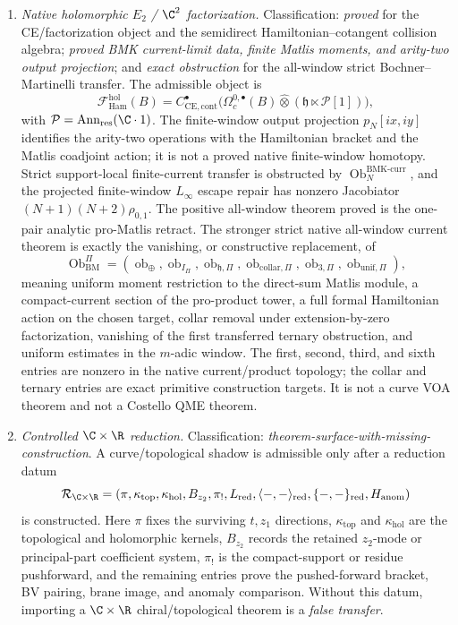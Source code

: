 \begin{enumerate}
  \item \emph{Native holomorphic \(E_2\) / \(\C^2\) factorization.}
  Classification: \emph{proved} for the CE/factorization object and the
  semidirect Hamiltonian--cotangent collision algebra;
  \emph{proved BMK current-limit data, finite Matlis moments, and
  arity-two output projection}; and
  \emph{exact obstruction} for the all-window strict
  Bochner--Martinelli transfer.  The admissible object is
  \[
    \mathcal F_{\mathrm{Ham}}^{\mathrm{hol}}(B)
    =
    C^\bullet_{\mathrm{CE},\mathrm{cont}}
    \bigl(\Omega_c^{0,\bullet}(B)\widehat\otimes
    (\mathfrak h\ltimes\mathcal P[1])\bigr),
  \]
  with \(\mathcal P=\operatorname{Ann}_{\mathrm{res}}(\C\cdot1)\).
  The finite-window output projection \(p_N[ix,iy]\) identifies the
  arity-two operations with the Hamiltonian bracket and the Matlis
  coadjoint action; it is not a proved native finite-window homotopy.
  Strict support-local finite-current transfer is obstructed by
  \(\operatorname{Ob}^{\mathrm{BMK\mbox{-}curr}}_N\), and the projected
  finite-window \(L_\infty\) escape repair has nonzero Jacobiator
  \((N+1)(N+2)\rho_{0,1}\).  The positive all-window theorem proved
  is the one-pair analytic pro-Matlis retract.  The stronger
  strict native all-window current theorem is exactly the vanishing, or
  constructive replacement, of
  \[
    \operatorname{Ob}^{\Pi}_{\mathrm{BM}}
    =
    (\operatorname{ob}_{\oplus},
     \operatorname{ob}_{I_\Pi},
     \operatorname{ob}_{\mathfrak h,\Pi},
     \operatorname{ob}_{\mathrm{collar},\Pi},
     \operatorname{ob}_{3,\Pi},
     \operatorname{ob}_{\mathrm{unif},\Pi}),
  \]
  meaning uniform moment restriction to the direct-sum Matlis module,
  a compact-current section of the pro-product tower, a full formal
  Hamiltonian action on the chosen target, collar removal under
  extension-by-zero factorization, vanishing of the first transferred
  ternary obstruction, and uniform estimates in the \(m\)-adic window.
  The first, second, third, and sixth entries are nonzero in the native
  current/product topology; the collar and ternary entries are exact
  primitive construction targets.
  It is not a curve VOA theorem and not a Costello QME theorem.

  \item \emph{Controlled \(\C\times\R\) reduction.}
  Classification: \emph{theorem-surface-with-missing-construction}.
  A curve/topological shadow is admissible only after a reduction datum
  \[
    \mathcal R_{\C\times\R}
    =
    (\pi,\kappa_{\mathrm{top}},\kappa_{\mathrm{hol}},
     B_{z_2},\pi_!,L_{\mathrm{red}},
     \langle-,-\rangle_{\mathrm{red}},
     \{-,-\}_{\mathrm{red}},H_{\mathrm{anom}})
  \]
  is constructed.  Here \(\pi\) fixes the surviving \(t,z_1\)
  directions, \(\kappa_{\mathrm{top}}\) and
  \(\kappa_{\mathrm{hol}}\) are the topological and holomorphic kernels,
  \(B_{z_2}\) records the retained \(z_2\)-mode or principal-part
  coefficient system, \(\pi_!\) is the compact-support or residue
  pushforward, and the remaining entries prove the pushed-forward
  bracket, BV pairing, brane image, and anomaly comparison.  Without
  this datum, importing a \(\C\times\R\) chiral/topological theorem is a
  \emph{false transfer}.


\end{enumerate}

